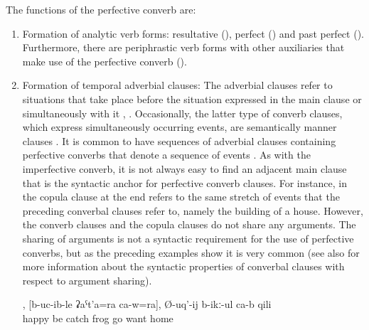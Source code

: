 The functions of the perfective converb are:
%
\begin{enumerate}
	\item	Formation of analytic verb forms: resultative (), perfect () and past perfect (). Furthermore, there are periphrastic verb forms with other auxiliaries that make use of the perfective converb ().

	\item	Formation of temporal adverbial clauses: The adverbial clauses refer to situations that take place before the situation expressed in the main clause or simultaneously with it , . Occasionally, the latter type of converb clauses, which express simultaneously occurring events, are semantically manner clauses . It is common to have sequences of adverbial clauses containing perfective converbs that denote a sequence of events . As with the imperfective converb, it is not always easy to find an adjacent main clause that is the syntactic anchor for perfective converb clauses. For instance, in  the copula clause at the end refers to the same stretch of events that the preceding converbal clauses refer to, namely the building of a house. However, the converb clauses and the copula clauses do not share any arguments. The sharing of arguments is not a syntactic requirement for the use of perfective converbs, but as the preceding examples  show it is very common (see also  for more information about the syntactic properties of converbal clauses with respect to argument sharing).
	\begin{exe}
		\ex	\label{ex:‎He got happy, caught his frog, and wants to go home}
		\gll	[razi	Ø-iχ-ub-le],	[b-uc-ib-le	ʡaˁt'a=ra	ca-w=ra],	Ø-uq'-ij	b-ikː-ul	ca-b	qili\\
			happy	be	catch	frog		go	want		home\\
		\glt	{}


\end{exe}
\end{enumerate}
